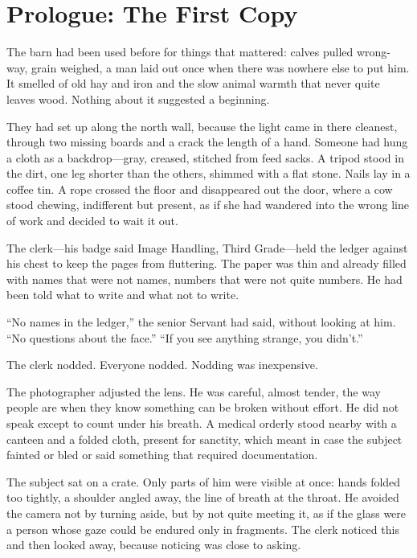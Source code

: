 \chapter*{Prologue: The First Copy}

The barn had been used before for things that mattered: calves pulled wrong-way, grain weighed, a man laid out once when there was nowhere else to put him. It smelled of old hay and iron and the slow animal warmth that never quite leaves wood. Nothing about it suggested a beginning.

They had set up along the north wall, because the light came in there cleanest, through two missing boards and a crack the length of a hand. Someone had hung a cloth as a backdrop---gray, creased, stitched from feed sacks. A tripod stood in the dirt, one leg shorter than the others, shimmed with a flat stone. Nails lay in a coffee tin. A rope crossed the floor and disappeared out the door, where a cow stood chewing, indifferent but present, as if she had wandered into the wrong line of work and decided to wait it out.

The clerk---his badge said Image Handling, Third Grade---held the ledger against his chest to keep the pages from fluttering. The paper was thin and already filled with names that were not names, numbers that were not quite numbers. He had been told what to write and what not to write.

``No names in the ledger,'' the senior Servant had said, without looking at him.
``No questions about the face.''
``If you see anything strange, you didn't.''

The clerk nodded. Everyone nodded. Nodding was inexpensive.

The photographer adjusted the lens. He was careful, almost tender, the way people are when they know something can be broken without effort. He did not speak except to count under his breath. A medical orderly stood nearby with a canteen and a folded cloth, present for sanctity, which meant in case the subject fainted or bled or said something that required documentation.

The subject sat on a crate. Only parts of him were visible at once: hands folded too tightly, a shoulder angled away, the line of breath at the throat. He avoided the camera not by turning aside, but by not quite meeting it, as if the glass were a person whose gaze could be endured only in fragments. The clerk noticed this and then looked away, because noticing was close to asking.

